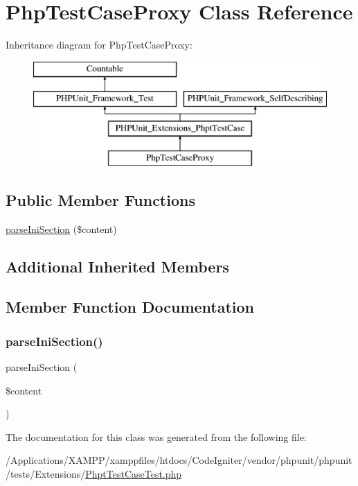 \hypertarget{class_php_test_case_proxy}{}\section{Php\+Test\+Case\+Proxy Class Reference}
\label{class_php_test_case_proxy}
Inheritance diagram for Php\+Test\+Case\+Proxy\+:\begin{figure}[H]
\begin{center}
\leavevmode
\includegraphics[height=4.000000cm]{class_php_test_case_proxy}
\end{center}
\end{figure}
\subsection*{Public Member Functions}
\begin{DoxyCompactItemize}
\item 
\mbox{\hyperlink{class_php_test_case_proxy_ad069d30738c82a20b6241c92e4dfa747}{parse\+Ini\+Section}} (\$content)
\end{DoxyCompactItemize}
\subsection*{Additional Inherited Members}


\subsection{Member Function Documentation}
\mbox{\label{class_php_test_case_proxy_ad069d30738c82a20b6241c92e4dfa747}} 
\subsubsection{\texorpdfstring{parse\+Ini\+Section()}{parseIniSection()}}
{\footnotesize\ttfamily parse\+Ini\+Section (\begin{DoxyParamCaption}\item[{}]{\$content }\end{DoxyParamCaption})}



The documentation for this class was generated from the following file\+:\begin{DoxyCompactItemize}
\item 
/\+Applications/\+X\+A\+M\+P\+P/xamppfiles/htdocs/\+Code\+Igniter/vendor/phpunit/phpunit/tests/\+Extensions/\mbox{\hyperlink{_phpt_test_case_test_8php}{Phpt\+Test\+Case\+Test.\+php}}\end{DoxyCompactItemize}
